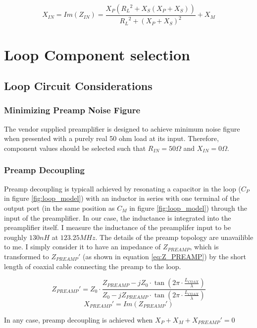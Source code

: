 \begin{equation} \label{eq:X_IN}
    X_{IN}= Im(Z_{IN}) = \frac{X_P ({R_L}^2 + X_S(X_P+X_S))}{{R_L}^2+(X_P+X_S)^2}+X_M
\end{equation}

\section{Loop Component selection}
\subsection{Loop Circuit Considerations}
\subsubsection{Minimizing Preamp Noise Figure}
The vendor supplied preamplifier is designed to achieve minimum noise figure when presented with a purely real 50 ohm 
load at its input. Therefore, component values should be selected such that $R_{IN}=50\Omega$ and $X_{IN}=0\Omega$.
\subsubsection{Preamp Decoupling}
Preamp decoupling is typicall achieved by resonating a capacitor in the loop ($C_P$ in figure \ref{fig:loop_model}) with
an inductor in series with one terminal of the output port (in the same position as $C_M$ in figure
\ref{fig:loop_model}) through the input of the preamplifier. In our case, the inductance is integrated into the
preamplifier itself. I measure the inductance of the preamplifer input to be roughly $130nH$ at $123.25 MHz$. The
details of the preamp topology are unavailible to me. I simply consider it to have an impedance of $Z_{PREAMP}$, which
is transformed to ${Z_{PREAMP}}'$ (as shown in equation \ref{eq:Z_PREAMP}) by the short length of coaxial cable
connecting the preamp to the loop.


\begin{equation} \label{eq:Z_PREAMP}
    {Z_{PREAMP}}'=Z_0 \cdot \frac{Z_{PREAMP}-j Z_0 \cdot \tan(2\pi\cdot\frac{L_{COAX}}{\lambda})}{Z_0 - j Z_{PREAMP} \cdot
    \tan(2\pi\cdot\frac{L_{COAX}}{\lambda})}
\end{equation}
\begin{equation} \label{eq:X_PREAMP}
    {X_{PREAMP}}'=Im({Z_{PREAMP}}')
\end{equation}
    
In any case, preamp decoupling is achieved when $X_P+X_M+{X_{PREAMP}}'=0$
